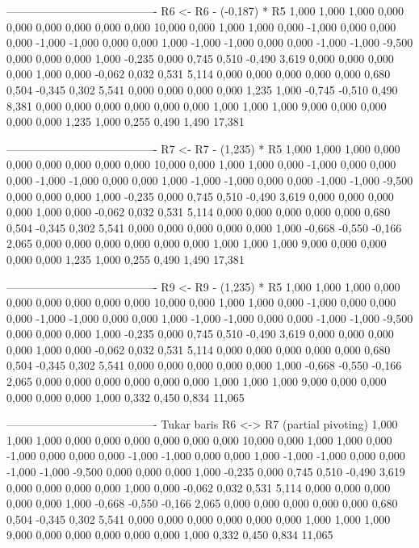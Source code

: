 \documentclass[12pt]{article}
\begin{document}
\begin{enumerate}
\begin{keluaran}
----------------------------------------
R6 <- R6 - (-0,187) * R5
1,000   1,000   1,000   0,000   0,000   0,000   0,000   0,000   0,000   10,000
0,000   1,000   1,000   0,000   -1,000  0,000   0,000   0,000   -1,000  -1,000
0,000   0,000   1,000   -1,000  -1,000  0,000   0,000   -1,000  -1,000  -9,500
0,000   0,000   0,000   1,000   -0,235  0,000   0,745   0,510   -0,490  3,619
0,000   0,000   0,000   0,000   1,000   0,000   -0,062  0,032   0,531   5,114
0,000   0,000   0,000   0,000   0,000   0,680   0,504   -0,345  0,302   5,541
0,000   0,000   0,000   0,000   1,235   1,000   -0,745  -0,510  0,490   8,381
0,000   0,000   0,000   0,000   0,000   0,000   1,000   1,000   1,000   9,000
0,000   0,000   0,000   0,000   1,235   1,000   0,255   0,490   1,490   17,381

----------------------------------------
R7 <- R7 - (1,235) * R5
1,000   1,000   1,000   0,000   0,000   0,000   0,000   0,000   0,000   10,000
0,000   1,000   1,000   0,000   -1,000  0,000   0,000   0,000   -1,000  -1,000
0,000   0,000   1,000   -1,000  -1,000  0,000   0,000   -1,000  -1,000  -9,500
0,000   0,000   0,000   1,000   -0,235  0,000   0,745   0,510   -0,490  3,619
0,000   0,000   0,000   0,000   1,000   0,000   -0,062  0,032   0,531   5,114
0,000   0,000   0,000   0,000   0,000   0,680   0,504   -0,345  0,302   5,541
0,000   0,000   0,000   0,000   0,000   1,000   -0,668  -0,550  -0,166  2,065
0,000   0,000   0,000   0,000   0,000   0,000   1,000   1,000   1,000   9,000
0,000   0,000   0,000   0,000   1,235   1,000   0,255   0,490   1,490   17,381

----------------------------------------
R9 <- R9 - (1,235) * R5
1,000   1,000   1,000   0,000   0,000   0,000   0,000   0,000   0,000   10,000
0,000   1,000   1,000   0,000   -1,000  0,000   0,000   0,000   -1,000  -1,000
0,000   0,000   1,000   -1,000  -1,000  0,000   0,000   -1,000  -1,000  -9,500
0,000   0,000   0,000   1,000   -0,235  0,000   0,745   0,510   -0,490  3,619
0,000   0,000   0,000   0,000   1,000   0,000   -0,062  0,032   0,531   5,114
0,000   0,000   0,000   0,000   0,000   0,680   0,504   -0,345  0,302   5,541
0,000   0,000   0,000   0,000   0,000   1,000   -0,668  -0,550  -0,166  2,065
0,000   0,000   0,000   0,000   0,000   0,000   1,000   1,000   1,000   9,000
0,000   0,000   0,000   0,000   0,000   1,000   0,332   0,450   0,834   11,065

----------------------------------------
Tukar baris R6 <-> R7 (partial pivoting)
1,000   1,000   1,000   0,000   0,000   0,000   0,000   0,000   0,000   10,000
0,000   1,000   1,000   0,000   -1,000  0,000   0,000   0,000   -1,000  -1,000
0,000   0,000   1,000   -1,000  -1,000  0,000   0,000   -1,000  -1,000  -9,500
0,000   0,000   0,000   1,000   -0,235  0,000   0,745   0,510   -0,490  3,619
0,000   0,000   0,000   0,000   1,000   0,000   -0,062  0,032   0,531   5,114
0,000   0,000   0,000   0,000   0,000   1,000   -0,668  -0,550  -0,166  2,065
0,000   0,000   0,000   0,000   0,000   0,680   0,504   -0,345  0,302   5,541
0,000   0,000   0,000   0,000   0,000   0,000   1,000   1,000   1,000   9,000
0,000   0,000   0,000   0,000   0,000   1,000   0,332   0,450   0,834   11,065


\end{keluaran}
\end{enumerate}
\end{document}
